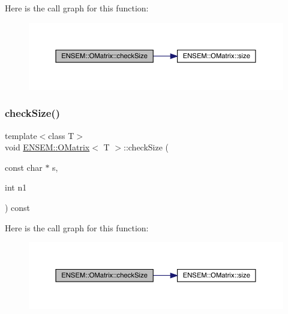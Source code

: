 Here is the call graph for this function\+:
\nopagebreak
\begin{figure}[H]
\begin{center}
\leavevmode
\includegraphics[width=350pt]{dd/d80/classENSEM_1_1OMatrix_abec80929ab7e8e2a23822fbbc841bd87_cgraph}
\end{center}
\end{figure}
\mbox{\label{classENSEM_1_1OMatrix_a8e4c3a86b8055f6e67c8fd914b2898ca}} 
\subsubsection{\texorpdfstring{checkSize()}{checkSize()}\hspace{0.1cm}{\footnotesize\ttfamily [4/6]}}
{\footnotesize\ttfamily template$<$class T$>$ \\
void \mbox{\hyperlink{classENSEM_1_1OMatrix}{E\+N\+S\+E\+M\+::\+O\+Matrix}}$<$ T $>$\+::check\+Size (\begin{DoxyParamCaption}\item[{const char $\ast$}]{s,  }\item[{int}]{n1 }\end{DoxyParamCaption}) const\hspace{0.3cm}{\ttfamily [inline]}}

Here is the call graph for this function\+:
\nopagebreak
\begin{figure}[H]
\begin{center}
\leavevmode
\includegraphics[width=350pt]{dd/d80/classENSEM_1_1OMatrix_a8e4c3a86b8055f6e67c8fd914b2898ca_cgraph}
\end{center}
\end{figure}
\mbox{\label{classENSEM_1_1OMatrix_a8e4c3a86b8055f6e67c8fd914b2898ca}} 
